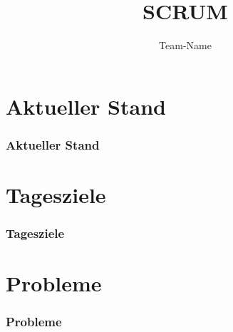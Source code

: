 \documentclass[ddcfooter,nototalpage]{tudbeamer}
\begin{document}
\title{SCRUM}
\author{Team-Name}
\maketitle

\section{Aktueller Stand}
\begin{frame}
\frametitle{Aktueller Stand}
\end{frame}

\section{Tagesziele}
\begin{frame}
\frametitle{Tagesziele}
\end{frame}

\section{Probleme}
\begin{frame}
\frametitle{Probleme}
\end{frame}
\end{document}
